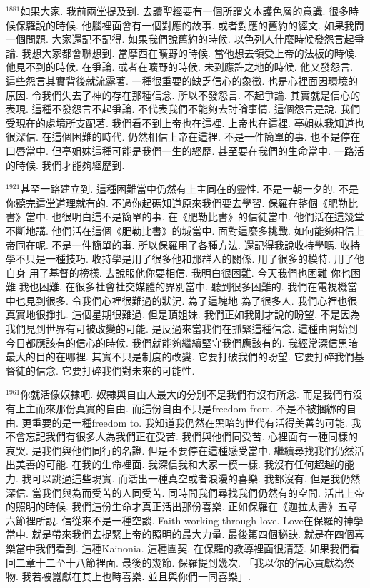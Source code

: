 \documentclass{book}
\begin{document}
$^{1881}$如果大家.
我前兩堂提及到.
去讀聖經要有一個所謂文本護色層的意識.
很多時候保羅說的時候.
他腦裡面會有一個對應的故事.
或者對應的舊約的經文.
如果我問一個問題.
大家還記不記得.
如果我們說舊約的時候.
以色列人什麼時候發怨言起爭論.
我想大家都會聯想到.
當摩西在曠野的時候.
當他想去領受上帝的法板的時候.
他見不到的時候.
在爭論.
或者在曠野的時候.
未到應許之地的時候.
他又發怨言.
這些怨言其實背後就流露著.
一種很重要的缺乏信心的象徵.
也是心裡面因環境的原因.
令我們失去了神的存在那種信念.
所以不發怨言.
不起爭論.
其實就是信心的表現.
這種不發怨言不起爭論.
不代表我們不能夠去討論事情.
這個怨言是說.
我們受現在的處境所支配著.
我們看不到上帝也在這裡.
上帝也在這裡.
亭姐妹我知道也很深信.
在這個困難的時代.
仍然相信上帝在這裡.
不是一件簡單的事.
也不是停在口唇當中.
但亭姐妹這種可能是我們一生的經歷.
甚至要在我們的生命當中.
一路活的時候.
我們才能夠經歷到.

$^{1921}$甚至一路建立到.
這種困難當中仍然有上主同在的靈性.
不是一朝一夕的.
不是你聽完這堂道理就有的.
不過你起碼知道原來我們要去學習.
保羅在整個《肥勒比書》當中.
也很明白這不是簡單的事.
在《肥勒比書》的信徒當中.
他們活在這幾堂不斷地講.
他們活在這個《肥勒比書》的城當中.
面對這麼多挑戰.
如何能夠相信上帝同在呢.
不是一件簡單的事.
所以保羅用了各種方法.
還記得我說收持學嗎.
收持學不只是一種技巧.
收持學是用了很多他和那群人的關係.
用了很多的模特.
用了他自身 用了基督的榜樣.
去說服他你要相信.
我明白很困難.
今天我們也困難 你也困難 我也困難.
在很多社會社交媒體的界別當中.
聽到很多困難的.
我們在電視機當中也見到很多.
令我們心裡很難過的狀況.
為了這塊地 為了很多人.
我們心裡也很真實地很掙扎.
這個星期很難過.
但是頂姐妹.
我們正如我剛才說的盼望.
不是因為我們見到世界有可被改變的可能.
是反過來當我們在抓緊這種信念.
這種由開始到今日都應該有的信心的時候.
我們就能夠繼續堅守我們應該有的.
我經常深信黑暗最大的目的在哪裡.
其實不只是制度的改變.
它要打破我們的盼望.
它要打碎我們基督徒的信念.
它要打碎我們對未來的可能性.

$^{1961}$你就活像奴隸吧.
奴隸與自由人最大的分別不是我們有沒有所念.
而是我們有沒有上主而來那份真實的自由.
而這份自由不只是freedom from.
不是不被捆綁的自由.
更重要的是一種freedom to.
我知道我仍然在黑暗的世代有活得美善的可能.
我不會忘記我們有很多人為我們正在受苦.
我們與他們同受苦.
心裡面有一種同樣的哀哭.
是我們與他們同行的名證.
但是不要停在這種感受當中.
繼續尋找我們仍然活出美善的可能.
在我的生命裡面.
我深信我和大家一模一樣.
我沒有任何超越的能力.
我可以跳過這些現實.
而活出一種真空或者浪漫的喜樂.
我都沒有.
但是我仍然深信.
當我們與為而受苦的人同受苦.
同時間我們尋找我們仍然有的空間.
活出上帝的照明的時候.
我們這份生命才真正活出那份喜樂.
正如保羅在《迦拉太書》五章六節裡所說.
信從來不是一種空談.
Faith working through love.
Love在保羅的神學當中.
就是帶來我們去捉緊上帝的照明的最大力量.
最後第四個秘訣.
就是在四個喜樂當中我們看到.
這種Kainonia.
這種團契.
在保羅的教導裡面很清楚.
如果我們看回二章十二至十八節裡面.
最後的幾節.
保羅提到幾次.
「我以你的信心貢獻為祭物.
我若被囂獻在其上也時喜樂.
並且與你們一同喜樂」.
\end{document}
